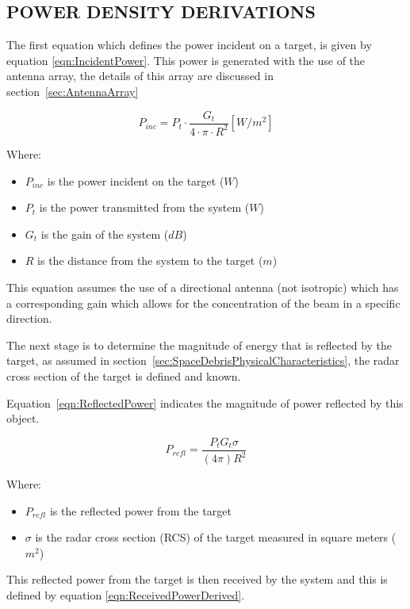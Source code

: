 \documentclass[11pt]{witseiepaper}
\begin{document}
\begin{bibunit}[witseie]
\section{POWER DENSITY DERIVATIONS} \label{sec:PowerDensityDerivations}
The first equation which defines the power incident on a target, is given by equation \ref{eqn:IncidentPower}. This power is generated with the use of the antenna array, the details of this array are discussed in section~\ref{sec:AntennaArray}

\begin{equation} \label{eqn:IncidentPower}
P_{inc} = P_t \cdot \frac{G_{t}}{4 \cdot \pi \cdot R^2} [W/m^2]
\end{equation}

Where:
\begin{itemize}
    \item $P_{inc}$ is the power incident on the target ($W$)
    \item $P_t$ is the power transmitted from the system ($W$)
    \item $G_t$ is the gain of the system ($dB$)
    \item $R$ is the distance from the system to the target ($m$)
\end{itemize}

This equation assumes the use of a directional antenna (not isotropic) which has a corresponding gain which allows for the concentration of the beam in a specific direction.

The next stage is to determine the magnitude of energy that is reflected by the target, as assumed in section~\ref{sec:SpaceDebrisPhysicalCharacteristics}, the radar cross section of the target is defined and known. 

Equation~\ref{eqn:ReflectedPower} indicates the magnitude of power reflected by this object.

\begin{equation} \label{eqn:ReflectedPower}
P_{refl} = \frac{P_{t} G_{t} \sigma}{(4 \pi) R^2}
\end{equation}

Where:
\begin{itemize}
    \item $P_{refl}$ is the reflected power from the target
    \item $\sigma$ is the radar cross section (RCS) of the target measured in square meters ($m^2$)
\end{itemize}

This reflected power from the target is then received by the system and this is defined by equation \ref{eqn:ReceivedPowerDerived}.


\end{bibunit}
\end{document}

